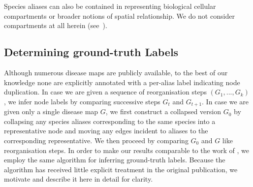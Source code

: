 \documentclass[
	fontsize=10pt, %
	twoside=false, %
	secnumdepth=1, %
  toc=indentunnumbered %
]{kaobook}
\begin{document}
Species aliases can also be contained in  representing
biological cellular compartments or broader notions of spatial relationship. We
do not consider compartments at all herein (see~).





\subsection{Determining ground-truth Labels}
Although numerous disease maps are publicly available, to the best of our
knowledge none are explicitly annotated with a per-alias label indicating node
duplication. In case we are given a sequence of reorganisation steps $(G_1, ...,
G_k)$ , we infer node labels by comparing successive steps $G_t$ and $G_{t+1}$.
In
case we are given only a single disease map $G$, we first construct a collapsed
version $G_0$ by collapsing any species aliases
corresponding to the same species into a representative node and moving any edges
incident to aliases to the corresponding representative. We then proceed by
comparing $G_0$ and $G$ like reorganisation steps.
%
In order to make our results comparable to the work of
\citeauthor{nielsen_MachineLearningSupport_2019}
\cite{nielsen_MachineLearningSupport_2019}, we employ the same algorithm for
inferring ground-truth labels. Because the algorithm has received little
explicit treatment in the original publication, we motivate and describe it here
in detail for clarity.
%
\end{document}
